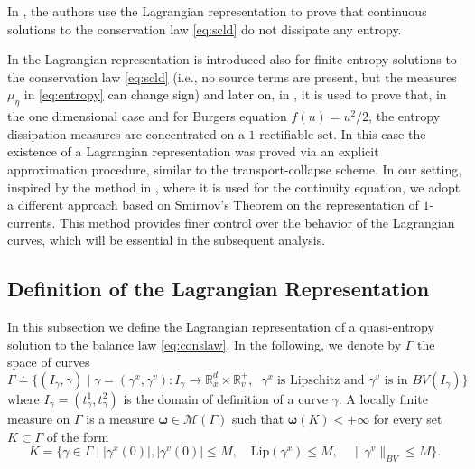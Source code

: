 \documentclass[11pt, twoside, reqno]{amsart}
\theoremstyle{definition}
\theoremstyle{remark}
\numberwithin{equation}{section}
\newcommand{\bs}[1]{\boldsymbol{#1}}
\begin{document}
In \cite{BBM_multid}, the authors use the Lagrangian representation to prove that continuous solutions to the conservation law \eqref{eq:scld} do not dissipate any entropy.

In \cite{marconi_structure} the Lagrangian representation is introduced also for finite entropy solutions to the conservation law \eqref{eq:scld} (i.e., no source terms are present, but the measures $\mu_{\eta}$ in \eqref{eq:entropy}  can change sign) and later on, in \cite{marconi_burgers}, it is used to prove that, in the one dimensional case and for Burgers equation $f(u) = u^2/2$, the entropy dissipation measures are concentrated on a $1$-rectifiable set. In this case the existence of a Lagrangian representation was proved via an explicit approximation procedure, similar to the transport-collapse scheme. In our setting, inspired by the method in \cite{Bon17}, where it is used for the continuity equation, we adopt a different approach based on Smirnov's Theorem on the representation of $1$-currents. This method provides finer control over the behavior of the Lagrangian curves, which will be essential in the subsequent analysis.



\subsection{Definition of the Lagrangian Representation}
In this subsection we define the Lagrangian representation of a quasi-entropy solution to the balance law \eqref{eq:conslaw}.
In the following, we denote by $\Gamma$ the space of curves
$$
\Gamma \doteq   \Big\{(I_{\gamma}, \gamma)\; \big| \;  \gamma = (\gamma^x, \gamma^v):I_{\gamma} \to \mathbb R^d_x \times \mathbb R^+_v,\; \; \gamma^x\;  \text{is Lipschitz and $\gamma^v$ is in $BV(I_\gamma)$}\Big\}
$$
where $I_{\gamma} = (t^1_{\gamma}, t^2_{\gamma})$ is the domain of definition of a curve $\gamma$.
A locally finite measure on $\Gamma$ is a measure $\bs \omega \in \mathscr M(\Gamma)$ such that $\bs \omega(K) < +\infty$ for every set $K \subset \Gamma$ of the form 
$$
 K = \Big\{  \gamma \in \Gamma \; \big| \;|\gamma^x(0)|, |\gamma^v(0)| \leq M, \quad \mathrm{Lip} (\gamma^x) \leq M, \quad \| \gamma^v\|_{BV} \leq M \Big\}.
$$
\end{document}
